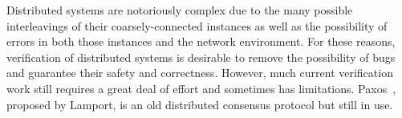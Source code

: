 
Distributed systems are notoriously complex due to the many possible interleavings of their coarsely-connected 
instances as well as the possibility of errors in both  those instances and the network environment. 
For these reasons, verification of distributed systems is desirable to remove the possibility of bugs and guarantee their safety and correctness. 
However, much current verification work still requires a great deal of effort and sometimes has limitations.
Paxos~\cite{paxos}, proposed by Lamport, is an old distributed consensus protocol but still in use. 


%
%
%
%
%
